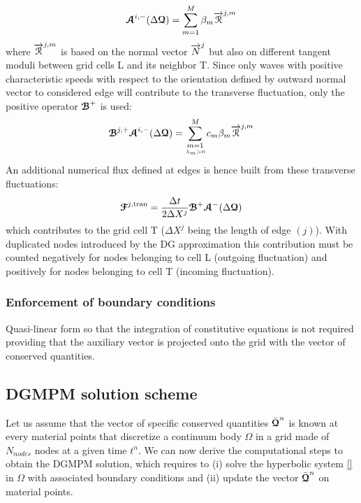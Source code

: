 \begin{equation}
{\boldsymbol{\mathcal{A}}}^{i,-}(\Delta {\boldsymbol{\mathcal{Q}}}) = \sum_{m=1}^{M} \beta_m {\overrightarrow{\mathcal{R}}}^{j,m}
\end{equation}
where ${\overrightarrow{\mathcal{R}}}^{j,m}$ is based on the normal vector ${\overrightarrow{N}}^j$ but also on different tangent moduli between grid cells L and its neighbor T. Since only waves with positive characteristic speeds with respect to the orientation defined by outward normal vector to considered edge will contribute to the transverse fluctuation, only the positive operator ${\boldsymbol{\mathcal{B}}}^+$ is used:
\begin{equation}
{\boldsymbol{\mathcal{B}}}^{j,+} {\boldsymbol{\mathcal{A}}}^{i,-}(\Delta {\boldsymbol{\mathcal{Q}}}) = \sum_{\underset{\lambda_m >0}{m=1}}^{M} c_m \beta_m {\overrightarrow{\mathcal{R}}}^{j,m}
\end{equation}
An additional numerical flux defined at edges is hence built from these transverse fluctuations:
\begin{equation}
{\boldsymbol{\mathcal{F}}}^{j,\text{tran}} = \frac{\Delta t}{2 \Delta X^j} {\boldsymbol{\mathcal{B}}}^+ {\boldsymbol{\mathcal{A}}}^-(\Delta {\boldsymbol{\mathcal{Q}}})
\end{equation}
which contributes to the grid cell T ($\Delta X^j$ being the length of edge $(j)$). With duplicated nodes introduced by the DG approximation this contribution must be counted negatively for nodes belonging to cell L (outgoing fluctuation) and positively for nodes belonging to cell T (incoming fluctuation).
\subsubsection*{Enforcement of boundary conditions}
Quasi-linear form so that the integration of constitutive equations is not required providing that the auxiliary vector is projected onto the grid with the vector of conserved quantities.

\subsection{DGMPM solution scheme}
Let us assume that the vector of specific conserved quantities $\bar{{\boldsymbol{\mathcal{Q}}}}^n$ is known at every material points that discretize a continuum body $\Omega$ in a grid made of $N_{nodes}$ nodes at a given time $t^n$. We can now derive the computational steps to obtain the DGMPM solution, which requires to (i) solve the hyperbolic system \eqref{} in $\Omega$ with associated boundary conditions and (ii) update the vector $\bar{{\boldsymbol{\mathcal{Q}}}}^n$ on material points.

